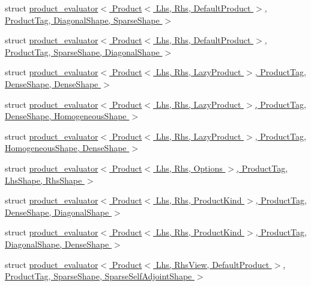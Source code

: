 \begin{DoxyCompactItemize}
\item 
struct \hyperlink{struct_eigen_1_1internal_1_1product__evaluator_3_01_product_3_01_lhs_00_01_rhs_00_01_default_pro850b56c5eb8e297547f40d125e705127}{product\+\_\+evaluator$<$ Product$<$ Lhs, Rhs, Default\+Product $>$, Product\+Tag, Diagonal\+Shape, Sparse\+Shape $>$}
\item 
struct \hyperlink{struct_eigen_1_1internal_1_1product__evaluator_3_01_product_3_01_lhs_00_01_rhs_00_01_default_prod80b2bd6031901e266d576d7eb3e9735}{product\+\_\+evaluator$<$ Product$<$ Lhs, Rhs, Default\+Product $>$, Product\+Tag, Sparse\+Shape, Diagonal\+Shape $>$}
\item 
struct \hyperlink{struct_eigen_1_1internal_1_1product__evaluator_3_01_product_3_01_lhs_00_01_rhs_00_01_lazy_produc1ed1c0c8715953d10d735722e273406b}{product\+\_\+evaluator$<$ Product$<$ Lhs, Rhs, Lazy\+Product $>$, Product\+Tag, Dense\+Shape, Dense\+Shape $>$}
\item 
struct \hyperlink{struct_eigen_1_1internal_1_1product__evaluator_3_01_product_3_01_lhs_00_01_rhs_00_01_lazy_producdc5bcb3d77429f754f91ead5635235a9}{product\+\_\+evaluator$<$ Product$<$ Lhs, Rhs, Lazy\+Product $>$, Product\+Tag, Dense\+Shape, Homogeneous\+Shape $>$}
\item 
struct \hyperlink{struct_eigen_1_1internal_1_1product__evaluator_3_01_product_3_01_lhs_00_01_rhs_00_01_lazy_produc94c394146b0a8c54b74b1b296d175015}{product\+\_\+evaluator$<$ Product$<$ Lhs, Rhs, Lazy\+Product $>$, Product\+Tag, Homogeneous\+Shape, Dense\+Shape $>$}
\item 
struct \hyperlink{struct_eigen_1_1internal_1_1product__evaluator_3_01_product_3_01_lhs_00_01_rhs_00_01_options_01_34fdf849c0cc96fc7f8fe25f34362e65}{product\+\_\+evaluator$<$ Product$<$ Lhs, Rhs, Options $>$, Product\+Tag, Lhs\+Shape, Rhs\+Shape $>$}
\item 
struct \hyperlink{struct_eigen_1_1internal_1_1product__evaluator_3_01_product_3_01_lhs_00_01_rhs_00_01_product_kin7ddac0b59f4a730d2a73e162a876e10d}{product\+\_\+evaluator$<$ Product$<$ Lhs, Rhs, Product\+Kind $>$, Product\+Tag, Dense\+Shape, Diagonal\+Shape $>$}
\item 
struct \hyperlink{struct_eigen_1_1internal_1_1product__evaluator_3_01_product_3_01_lhs_00_01_rhs_00_01_product_kinb2964e3ecd5359c634047e003305b765}{product\+\_\+evaluator$<$ Product$<$ Lhs, Rhs, Product\+Kind $>$, Product\+Tag, Diagonal\+Shape, Dense\+Shape $>$}
\item 
struct \hyperlink{struct_eigen_1_1internal_1_1product__evaluator_3_01_product_3_01_lhs_00_01_rhs_view_00_01_defaule3daa34d3e750fc1a34e5c28fcdbf893}{product\+\_\+evaluator$<$ Product$<$ Lhs, Rhs\+View, Default\+Product $>$, Product\+Tag, Sparse\+Shape, Sparse\+Self\+Adjoint\+Shape $>$}

\end{DoxyCompactItemize}
